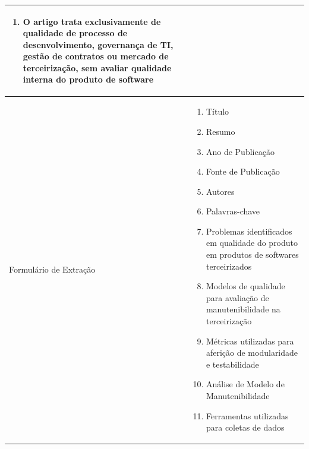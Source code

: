 \begin{longtable}{|p{4.5cm}|p{10.6cm}|}
\begin{enumerate}[nosep, leftmargin=*]
        \item O artigo trata exclusivamente de qualidade de processo de desenvolvimento, governança de TI, gestão de contratos ou mercado de terceirização, sem avaliar qualidade interna do produto de software
    \end{enumerate} \\
    \hline
    Formulário de Extração & \begin{enumerate}[nosep, leftmargin=*]
        \item Título
        \item Resumo
        \item Ano de Publicação
        \item Fonte de Publicação
        \item Autores
        \item Palavras-chave
        \item Problemas identificados em qualidade do produto em produtos de softwares terceirizados
        \item Modelos de qualidade para avaliação de manutenibilidade na terceirização
        \item Métricas utilizadas para aferição de modularidade e testabilidade
        \item Análise de Modelo de Manutenibilidade
        \item Ferramentas utilizadas para coletas de dados
    \end{enumerate} \\
\end{longtable}

